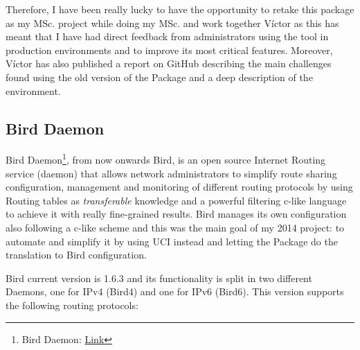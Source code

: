 Therefore, I have been really lucky to have the opportunity to retake this package as my MSc. project while doing my MSc. and work together Víctor as this has meant that I have had direct feedback from administrators using the tool in production environments and to improve its most critical features. Moreover, Víctor has also published a report on GitHub \cite{bgpbmx6} describing the main challenges found using the old version of the Package and a deep description of the environment.

\subsection{Bird Daemon}
Bird Daemon\footnote{Bird Daemon: \href{http://bird.network.cz/}{Link}}, from now onwards Bird, is an open source Internet Routing service (daemon) that allows network administrators to simplify route sharing configuration, management and monitoring of different routing protocols by using Routing tables as \textit{transferable} knowledge and a powerful filtering c-like language to achieve it with really fine-grained results. Bird manages its own configuration also following a c-like scheme and this was the main goal of my 2014 project: to automate and simplify it by using UCI instead and letting the Package do the translation to Bird configuration.

Bird current version is 1.6.3 and its functionality is split in two different Daemons, one for IPv4 (Bird4) and one for IPv6 (Bird6). This version supports the following routing protocols:

